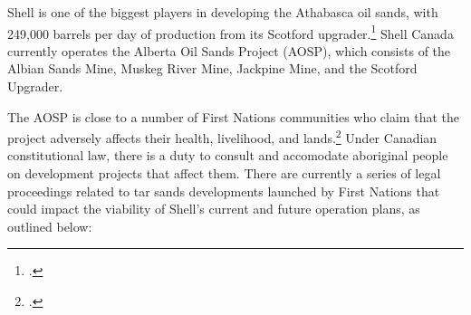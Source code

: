 Shell is one of the biggest players in developing the Athabasca oil sands, with 249,000 barrels per day of production from its Scotford upgrader.\footcite{AlbertaEnergy}
Shell Canada currently operates the Alberta Oil Sands Project (AOSP), which consists of the Albian Sands Mine, Muskeg River Mine, Jackpine Mine, and the Scotford Upgrader. 



The AOSP is close to a number of First Nations communities who claim that the project adversely affects their health, livelihood, and lands.\footcite[][]{RiskingRuin_2012}  
Under Canadian constitutional law, there is a duty to consult and accomodate aboriginal people on development projects that affect them.
There are currently a series of legal proceedings related to tar sands developments launched by First Nations that could impact the viability of Shell's current and future operation plans, as outlined below:
